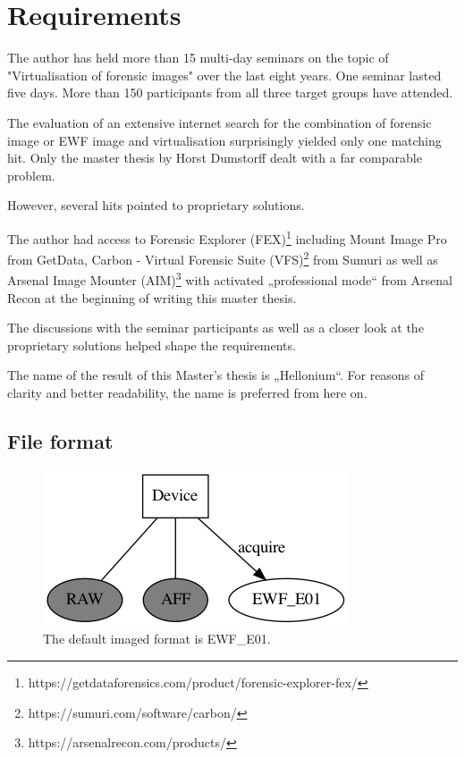 \chapter{Requirements}
\label{chap:requirements}

The author has held more than 15 multi-day seminars on the topic of "Virtualisation of forensic images" over the last eight years. One seminar lasted five days. More than 150 participants from all three target groups have attended.

The evaluation of an extensive internet search for the combination of \glqq{}forensic image\grqq{} or \glqq{}EWF image\grqq{} and \glqq{}virtualisation\grqq{} surprisingly yielded only one matching hit. Only the master thesis by Horst Dumstorff dealt with a far comparable problem.

However, several hits pointed to proprietary solutions.

The author had access to Forensic Explorer (FEX)\footnote{https://getdataforensics.com/product/forensic-explorer-fex/} including Mount Image Pro from GetData, Carbon - Virtual Forensic Suite (VFS)\footnote{https://sumuri.com/software/carbon/} from Sumuri as well as Arsenal Image Mounter (AIM)\footnote{https://arsenalrecon.com/products/} with activated „professional mode“ from Arsenal Recon at the beginning of writing this master thesis.

The discussions with the seminar participants as well as a closer look at the proprietary solutions helped shape the requirements.

The name of the result of this Master's thesis is „Hellonium“. For reasons of clarity and better readability, the name is preferred from here on.

\section{File format}
\label{sec:fileformat}

\begin{figure}[htbp]  %
  \centering
  \includegraphics[width=.5\textwidth]{figures/device-to-image.png}
  \caption[Focus on EWF\_E01]{The default imaged format is EWF\_E01.}
  \label{fig:ewfe01}
\end{figure}

